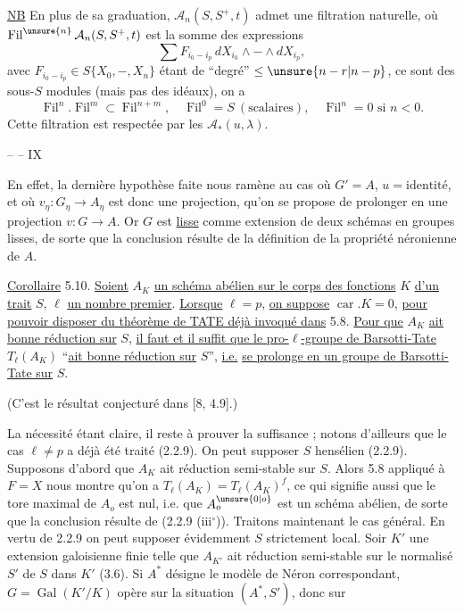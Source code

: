 \uline{NB} En plus de sa graduation, $\mathcal A_n(S,S^+,t)$ admet une filtration  naturelle, où $\operatorname{Fil}^{\unsure{n}}\mathcal A_n(S,S^+,t)$ est la somme des expressions
\[
\sum F_{i_0- i_p}\,dX_{i_0}\wedge-\wedge dX_{i_p},
\]
avec $F_{i_0-i_p}\in S\{X_0,-,X_n\}$ étant de ``degré'' $\leq\unsure{n-r|n-p}$, ce sont des sous-$S$ modules (mais pas des idéaux), on a
\[
\operatorname{Fil}^n.\operatorname{Fil}^m\subset\operatorname{Fil}^{n+m},\quad\operatorname{Fil}^0=S\ (\text{scalaires}),\quad\operatorname{Fil}^n=0\text{ si }n<0.
\]
Cette filtration est respectée par les $\mathcal A_*(u,\lambda)$.

\hfill --  -- \hfill IX

En effet, la dernière hypothèse faite nous ramène au cas où $G'=A$, $u=\text{identité}$, et où $v_\eta:G_\eta\longrightarrow A_\eta$ est donc une projection, qu'on se propose de prolonger en une projection $v:G\longrightarrow A$. Or $G$ est \uline{lisse} comme extension de deux schémas en groupes lisses, de sorte que la conclusion résulte de la définition de la propriété néronienne de $A$.

\uline{Corollaire} 5.10. \uline{Soient} $A_K$ \uline{un schéma abélien sur le corps des fonctions} $K$ \uline{d'un trait} $S$, $\ell$ \uline{un nombre premier}. \uline{Lorsque} $\ell=p$, \uline{on suppose} $\operatorname{car}.K=0$, \uline{pour pouvoir disposer du théorème de TATE déjà invoqué dans} 5.8. \uline{Pour que} $A_K$ \uline{ait bonne réduction sur} $S$, \uline{il faut et il suffit que le pro-$\ell$-groupe de Barsotti-Tate} $T_\ell(A_K)$ ``\uline{ait bonne réduction sur} $S$'', \uline{i.e.} \uline{se prolonge en un groupe de Barsotti-Tate sur} $S$.

(C'est le résultat conjecturé dans [8, 4.9].)

La nécessité étant claire, il reste à prouver la suffisance ; notons d'ailleurs que le cas $\ell\neq p$ a déjà été traité (2.2.9). On peut supposer $S$ hensélien (2.2.9). Supposons d'abord que $A_K$ ait réduction semi-stable sur $S$. Alors 5.8 appliqué à $F=X$ nous montre qu'on a $T_\ell(A_K)=T_\ell(A_K)^f$, ce qui signifie aussi que le tore maximal de $A_o$ est nul, i.e. que $A_o^{\unsure{0|o}}$ est un schéma abélien, de sorte que la conclusion résulte de (2.2.9 (iii$^\circ$)). Traitons maintenant le cas général. En vertu de 2.2.9 on peut supposer évidemment $S$ strictement local. Soir $K'$ une extension galoisienne finie telle que $A_{K'}$ ait réduction semi-stable sur le normalisé $S'$ de $S$ dans $K'$ (3.6). Si $A^*$ désigne le modèle de Néron correspondant, $G=\operatorname{Gal}(K'/K)$ opère sur la situation $(A^*,S')$, donc sur

